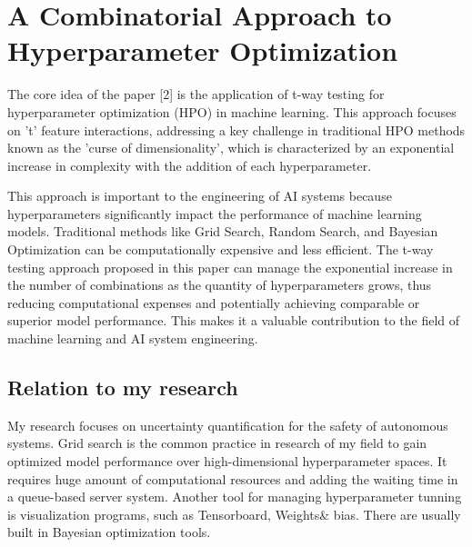 \documentclass{article}
\begin{document}
\section{A Combinatorial Approach to Hyperparameter Optimization}
The core idea of the paper [2] is the application of t-way testing for hyperparameter optimization (HPO) in machine learning. This approach focuses on 't' feature interactions, addressing a key challenge in traditional HPO methods known as the 'curse of dimensionality', which is characterized by an exponential increase in complexity with the addition of each hyperparameter.


This approach is important to the engineering of AI systems because hyperparameters significantly impact the performance of machine learning models. Traditional methods like Grid Search, Random Search, and Bayesian Optimization can be computationally expensive and less efficient. The t-way testing approach proposed in this paper can manage the exponential increase in the number of combinations as the quantity of hyperparameters grows, thus reducing computational expenses and potentially achieving comparable or superior model performance. This makes it a valuable contribution to the field of machine learning and AI system engineering.

\subsection{Relation to my research}
My research focuses on uncertainty quantification for the safety of autonomous systems. 
Grid search is the common practice in research of my field to gain optimized model performance over high-dimensional hyperparameter spaces.
It requires huge amount of computational resources and adding the waiting time in a queue-based server system.
Another tool for managing hyperparameter tunning is visualization programs, such as Tensorboard, Weights\& bias.
There are usually built in Bayesian optimization tools.
\end{document}
